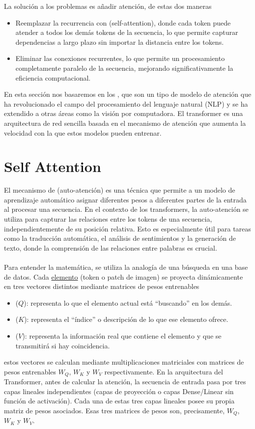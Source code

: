 \noindent
La solución a los problemas es añadir atención, de estas dos maneras
\begin{itemize}
    \item Reemplazar la recurrencia con  (self-attention), donde cada token puede atender a todos los demás tokens de la secuencia, lo que permite capturar dependencias a largo plazo sin importar la distancia entre los tokens.
    \item Eliminar las conexiones recurrentes, lo que permite un procesamiento completamente paralelo de la secuencia, mejorando significativamente la eficiencia computacional.
\end{itemize}
En esta sección nos basaremos en los , que son un tipo de modelo de atención que ha revolucionado el campo del procesamiento del lenguaje natural (NLP) y se ha extendido a otras áreas como la visión por computadora. El transformer es una arquitectura de red sencilla basada en el mecanismo de atención que aumenta la velocidad con la que estos modelos pueden entrenar.

\section{Self Attention}
\noindent
El mecanismo de  (auto-atención) es una técnica que permite a un modelo de aprendizaje automático asignar diferentes pesos a diferentes partes de la entrada al procesar una secuencia. En el contexto de los transformers, la auto-atención se utiliza para capturar las relaciones entre los tokens de una secuencia, independientemente de su posición relativa. Esto es especialmente útil para tareas como la traducción automática, el análisis de sentimientos y la generación de texto, donde la comprensión de las relaciones entre palabras es crucial. \\ \\

\noindent
Para entender la matemática, se utiliza la analogía de una búsqueda en una base de datos. Cada \underline{elemento} (token o patch de imagen) se proyecta dinámicamente en tres vectores distintos mediante matrices de pesos entrenables
\begin{itemize}
    \item {} ($Q$): representa lo que el elemento actual está ``buscando'' en los demás.
    \item {} ($K$): representa el ``índice'' o descripción de lo que ese elemento ofrece.
    \item {} ($V$): representa la información real que contiene el elemento y que se transmitirá si hay coincidencia.
\end{itemize}
estos vectores se calculan mediante multiplicaciones matriciales con matrices de pesos entrenables $W_Q$, $W_K$ y $W_V$ respectivamente. En la arquitectura del Transformer, antes de calcular la atención, la secuencia de entrada pasa por tres capas lineales independientes (capas de proyección o capas Dense/Linear sin función de activación). Cada una de estas tres capas lineales posee su propia matriz de pesos asociados. Esas tres matrices de pesos son, precisamente, $W_Q$, $W_K$ y $W_V$. \\

